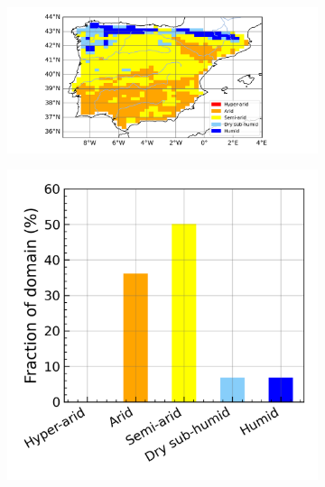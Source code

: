 \begin{figure}[htbp]
    \begin{subfigure}[b]{0.67\textwidth}
        \caption{}
        \includegraphics[width=\textwidth]{images/chap4/future/aridity_index_fut_noirr.png}
    \end{subfigure}
    \begin{subfigure}[b]{0.31\textwidth}
        \caption{}
        \includegraphics[width=\textwidth]{images/chap4/future/aridity_index_distribution_fut_noirr.png}
    \end{subfigure} \\


\end{figure}
